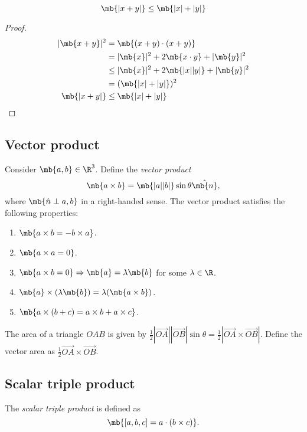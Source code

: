 \documentclass[a4paper]{article}
\begin{document}
\begin{cor}
  \[
  \mb{|x + y|} \leq \mb{|x| + |y|}
  \]
\end{cor}
\begin{proof}
  \begin{align*}
    |\mb{x + y}|^2 &= \mb{(x + y)\cdot (x + y)}\\
    &= |\mb{x}|^2 + 2\mb{x\cdot y} + |\mb{y}|^2\\
    &\leq |\mb{x}|^2 + 2\mb{|x||y|} + |\mb{y}|^2\\
    &= (\mb{|x| + |y|})^2\\
    \mb{|x + y|} &\leq \mb{|x| + |y|}
  \end{align*}
\end{proof}

\subsection{Vector product}
\begin{defi}
  Consider $\mb{a, b}\in \R^3$. Define the \emph{vector product}
  \[
  \mb{a\times b} = \mb{|a||b|}\sin\theta \hat{\mb{n}},
  \]
  where $\mb{\hat{n}\perp a, b}$ in a right-handed sense. The vector product satisfies the following properties:
  \begin{enumerate}
  \item $\mb{a\times b = -b\times a}$.
  \item $\mb{a\times a = 0}$.
  \item $\mb{a\times b = 0}\Rightarrow \mb{a} = \lambda\mb{b}$ for some $\lambda\in \R$.
  \item $\mb{a}\times (\lambda \mb{b}) = \lambda(\mb{a\times b})$.
  \item $\mb{a\times (b + c) = a\times b + a\times c}$.
  \end{enumerate}
\end{defi}

The area of a triangle $OAB$ is given by $\frac{1}{2}|\overrightarrow{OA}||\overrightarrow{OB}|\sin\theta = \frac{1}{2}|\overrightarrow{OA}\times\overrightarrow{OB}|$. Define the vector area as $\frac{1}{2}\overrightarrow{OA}\times\overrightarrow{OB}$.

\subsection{Scalar triple product}
\begin{defi}
  The \emph{scalar triple product} is defined as
  \[
  \mb{[a, b, c] = a\cdot (b\times c)}.
  \]
\end{defi}
\end{document}
